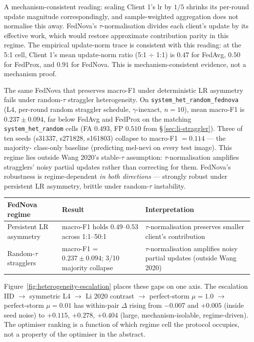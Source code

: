 A mechanism-consistent reading: scaling Client 1's $\textrm{lr}$ by $1/5$
shrinks its per-round update magnitude correspondingly, and sample-weighted
aggregation does not normalise this away. FedNova's $\tau$-normalisation
divides each client's update by its effective work, which would restore
approximate contribution parity in this regime. The empirical update-norm
trace is consistent with this reading: at the 5:1 cell, Client 1's mean
update-norm ratio (5:1 $\div$ 1:1) is $0.47$ for FedAvg, $0.50$ for FedProx,
and $0.91$ for FedNova. This is mechanism-consistent evidence, not a
mechanism proof.

The same FedNova that preserves macro-F1 under deterministic LR asymmetry
fails under random-$\tau$ straggler heterogeneity. On
\texttt{system\_het\_random\_fednova} (L4, per-round random straggler
schedule, $\gamma$-inexact, $n=10$), mean macro-F1 is $0.237 \pm 0.094$, far
below FedAvg and FedProx on the matching \texttt{system\_het\_random} cells
(FA $0.493$, FP $0.510$ from \S\,\ref{sec:li-straggler}). Three of ten seeds
(s31337, s271828, s161803) collapse to macro-F1 $= 0.114$ --- the majority-
class-only baseline (predicting mel-nevi on every test image). This regime
lies outside Wang 2020's stable-$\tau$ assumption: $\tau$-normalisation
amplifies stragglers' noisy partial updates rather than correcting for them.
FedNova's robustness is regime-dependent \emph{in both directions} ---
strongly robust under persistent LR asymmetry, brittle under random-$\tau$
instability.

\begin{center}
\begin{tabular}{lll}
\hline
FedNova regime              & Result                                   & Interpretation \\
\hline
Persistent LR asymmetry     & macro-F1 holds $0.49$--$0.53$ across 1:1--50:1 & $\tau$-normalisation preserves smaller client's contribution \\
Random-$\tau$ stragglers    & macro-F1 = $0.237 \pm 0.094$; 3/10 majority collapse & $\tau$-normalisation amplifies noisy partial updates (outside Wang 2020) \\
\hline
\end{tabular}
\end{center}

Figure~\ref{fig:heterogeneity-escalation} places these gaps on one axis.
The escalation IID $\to$ symmetric L4 $\to$ Li 2020 contrast $\to$
perfect-storm $\mu = 1.0$ $\to$ perfect-storm $\mu = 0.01$ has within-pair
$\Delta$ rising from $-0.007$ and $+0.005$ (inside seed noise) to $+0.115$,
$+0.278$, $+0.404$ (large, mechanism-isolable, regime-driven). The
optimiser ranking is a function of which regime cell the protocol occupies,
not a property of the optimiser in the abstract.

